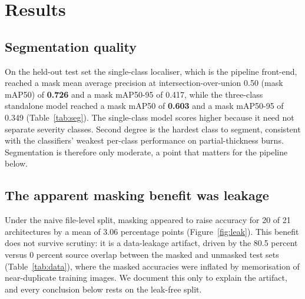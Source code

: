 \documentclass{elektr}
\begin{document}
\section{Results}
\label{Res}
\subsection{Segmentation quality}
\label{Res:seg}
On the held-out test set the single-class localiser, which is the pipeline front-end, reached a mask mean average precision at intersection-over-union 0.50 (mask mAP50) of \textbf{0.726} and a mask mAP50-95 of 0.417, while the three-class standalone model reached a mask mAP50 of \textbf{0.603} and a mask mAP50-95 of 0.349 (Table~\ref{tab:seg}). The single-class model scores higher because it need not separate severity classes. Second degree is the hardest class to segment, consistent with the classifiers' weakest per-class performance on partial-thickness burns. Segmentation is therefore only moderate, a point that matters for the pipeline below.


\subsection{The apparent masking benefit was leakage}
\label{Res:leak}
Under the naive file-level split, masking appeared to raise accuracy for 20 of 21 architectures by a mean of 3.06 percentage points (Figure~\ref{fig:leak}). This benefit does not survive scrutiny: it is a data-leakage artifact, driven by the 80.5 percent versus 0 percent source overlap between the masked and unmasked test sets (Table~\ref{tab:data}), where the masked accuracies were inflated by memorisation of near-duplicate training images. We document this only to explain the artifact, and every conclusion below rests on the leak-free split.
\end{document}
